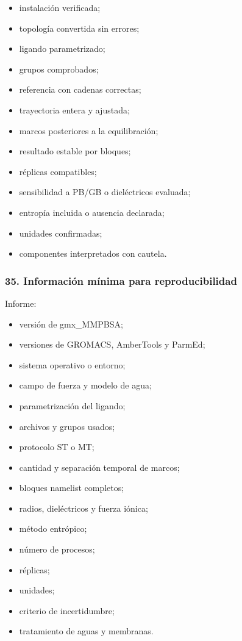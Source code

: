 \documentclass[
  spanish,
  11pt,
  a4paper]{article}
\providecommand{\tightlist}{%
  \setlength{\itemsep}{0pt}\setlength{\parskip}{0pt}}
\begin{document}
\begin{itemize}
\tightlist
\item
  instalación verificada;
\item
  topología convertida sin errores;
\item
  ligando parametrizado;
\item
  grupos comprobados;
\item
  referencia con cadenas correctas;
\item
  trayectoria entera y ajustada;
\item
  marcos posteriores a la equilibración;
\item
  resultado estable por bloques;
\item
  réplicas compatibles;
\item
  sensibilidad a PB/GB o dieléctricos evaluada;
\item
  entropía incluida o ausencia declarada;
\item
  unidades confirmadas;
\item
  componentes interpretados con cautela.
\end{itemize}

\subsubsection{35. Información mínima para
reproducibilidad}\label{informaciuxf3n-muxednima-para-reproducibilidad}

Informe:

\begin{itemize}
\tightlist
\item
  versión de gmx\_MMPBSA;
\item
  versiones de GROMACS, AmberTools y ParmEd;
\item
  sistema operativo o entorno;
\item
  campo de fuerza y modelo de agua;
\item
  parametrización del ligando;
\item
  archivos y grupos usados;
\item
  protocolo ST o MT;
\item
  cantidad y separación temporal de marcos;
\item
  bloques namelist completos;
\item
  radios, dieléctricos y fuerza iónica;
\item
  método entrópico;
\item
  número de procesos;
\item
  réplicas;
\item
  unidades;
\item
  criterio de incertidumbre;
\item
  tratamiento de aguas y membranas.
\end{itemize}
\end{document}
